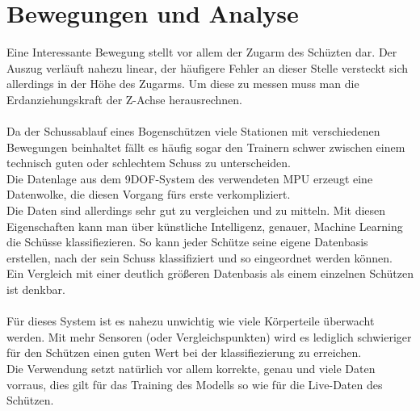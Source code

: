 \section{Bewegungen und Analyse}
Eine Interessante Bewegung stellt vor allem der Zugarm des 
Schüzten dar. Der Auszug verläuft nahezu linear, der häufigere Fehler 
an dieser Stelle versteckt sich allerdings in der Höhe des Zugarms. 
Um diese zu messen muss man die Erdanziehungskraft der Z-Achse herausrechnen.\\
\\
Da der Schussablauf eines Bogenschützen viele Stationen mit verschiedenen Bewegungen 
beinhaltet fällt es häufig sogar den Trainern schwer zwischen einem technisch guten
oder schlechtem Schuss zu unterscheiden.\\
Die Datenlage aus dem 9DOF-System des verwendeten MPU erzeugt eine Datenwolke, die 
diesen Vorgang fürs erste verkompliziert.\\
Die Daten sind allerdings sehr gut zu vergleichen und zu mitteln. Mit diesen 
Eigenschaften kann man über künstliche Intelligenz, genauer, Machine Learning 
die Schüsse klassifiezieren. So kann jeder Schütze seine eigene Datenbasis erstellen,
nach der sein Schuss klassifiziert und so eingeordnet werden können.\\
Ein Vergleich mit einer deutlich größeren Datenbasis als einem einzelnen Schützen ist denkbar.\\
\\
Für dieses System ist es nahezu unwichtig wie viele Körperteile überwacht werden.
Mit mehr Sensoren (oder Vergleichspunkten) wird es lediglich schwieriger für den
Schützen einen guten Wert bei der klassifiezierung zu erreichen.\\
Die Verwendung setzt natürlich vor allem korrekte, genau und viele Daten vorraus,
dies gilt für das Training des Modells so wie für die Live-Daten des Schützen.\\
\\
